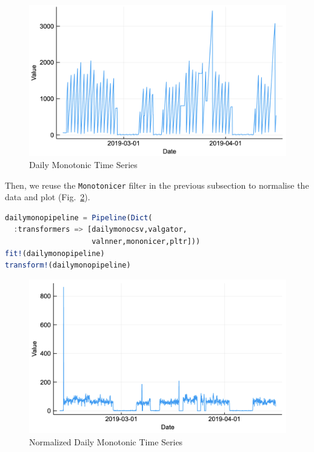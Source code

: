 \documentclass{juliacon}
\begin{document}
\begin{figure}[htbp]
   \centering
   \includegraphics[width=\columnwidth]{dailymono.png} %
   \caption{Daily Monotonic Time Series}
   \label{fig:dailymono}
\end{figure}


\vskip 6pt

Then, we reuse the \texttt{Monotonicer} filter in the previous subsection to normalise the data and plot (Fig.~\ref{fig:ndailymono}).

\begin{lstlisting}[language = Julia]
dailymonopipeline = Pipeline(Dict(
  :transformers => [dailymonocsv,valgator,
                    valnner,mononicer,pltr]))
fit!(dailymonopipeline)
transform!(dailymonopipeline)
\end{lstlisting}

\begin{figure}[htbp]
   \centering
   \includegraphics[width=\columnwidth]{normdailymono.png}  %
   \caption{Normalized Daily Monotonic Time Series}
   \label{fig:ndailymono}
\end{figure}
\end{document}
